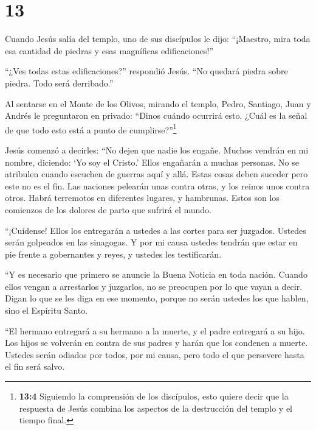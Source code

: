 \hypertarget{section-12}{%
\section{13}\label{section-12}}

 Cuando Jesús salía del templo, uno de sus discípulos le
dijo: ``¡Maestro, mira toda esa cantidad de piedras y esas magníficas
edificaciones!''

 ``¿Ves todas estas edificaciones?'' respondió Jesús. ``No
quedará piedra sobre piedra. Todo será derribado.''

 Al sentarse en el Monte de los Olivos, mirando el templo,
Pedro, Santiago, Juan y Andrés le preguntaron en privado: 
``Dinos cuándo ocurrirá esto. ¿Cuál es la señal de que todo esto está a
punto de cumplirse?''\footnote{\textbf{13:4} Siguiendo la comprensión de
  los discípulos, esto quiere decir que la respuesta de Jesús combina
  los aspectos de la destrucción del templo y el tiempo final.}

 Jesús comenzó a decirles: ``No dejen que nadie los engañe.
 Muchos vendrán en mi nombre, diciendo: `Yo soy el Cristo.'
Ellos engañarán a muchas personas.  No se atribulen cuando
escuchen de guerras aquí y allá. Estas cosas deben suceder pero este no
es el fin.  Las naciones pelearán unas contra otras, y los
reinos unos contra otros. Habrá terremotos en diferentes lugares, y
hambrunas. Estos son los comienzos de los dolores de parto que sufrirá
el mundo.

 ``¡Cuídense! Ellos los entregarán a ustedes a las cortes
para ser juzgados. Ustedes serán golpeados en las sinagogas. Y por mi
causa ustedes tendrán que estar en pie frente a gobernantes y reyes, y
ustedes les testificarán.

 ``Y es necesario que primero se anuncie la Buena Noticia
en toda nación.  Cuando ellos vengan a arrestarlos y
juzgarlos, no se preocupen por lo que vayan a decir. Digan lo que se les
diga en ese momento, porque no serán ustedes los que hablen, sino el
Espíritu Santo.

 ``El hermano entregará a su hermano a la muerte, y el
padre entregará a su hijo. Los hijos se volverán en contra de sus padres
y harán que los condenen a muerte.  Ustedes serán odiados
por todos, por mi causa, pero todo el que persevere hasta el fin será
salvo.

